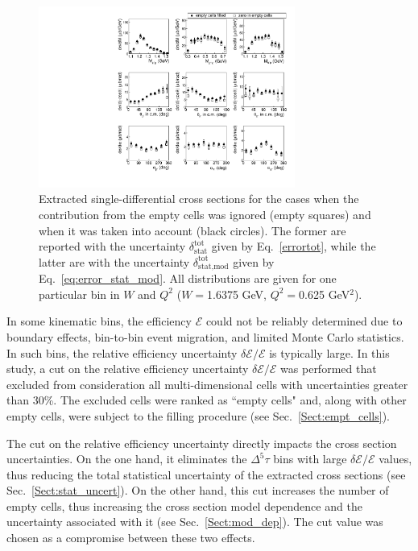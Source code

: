 \documentclass[prc,twocolumn,superscriptaddress,showpacs,amssymb,amsmath,amsfonts,aps,nofootinbib]{revtex4-1}
\begin{document}
\begin{figure}[htp]
\begin{center}
\includegraphics[width=0.75\textwidth]{pictures/corrections/cr_sec_all_top_new2.pdf}
\caption{\small Extracted single-differential cross sections for the cases when the contribution from the empty cells was ignored (empty squares) and when it was taken into account (black circles). The former are reported with the uncertainty $\delta_{\text{stat}}^{\text{tot}}$ given by Eq.\!~\eqref{errortot}, while the latter are with the uncertainty $\delta_{\text{stat,mod}}^{\text{tot}}$ given by Eq.\!~\eqref{eq:error_stat_mod}. All distributions are given for one particular bin in $W$ and $Q^2$ ($W = $1.6375 GeV, $Q^2 = $0.625 GeV$^2$).} \label{fig:empt_corr}
\end{center}
\end{figure}


In some kinematic bins, the efficiency $\mathcal{E}$ could not be reliably determined due to boundary effects, bin-to-bin event migration, and limited Monte Carlo statistics. In such bins, the relative efficiency uncertainty $\delta \mathcal{E}/\mathcal{E}$ is typically large. In this study, a cut on the relative efficiency uncertainty $\delta \mathcal{E}/\mathcal{E}$ was performed that excluded from consideration all multi-dimensional cells with uncertainties greater than 30\%. The excluded cells were ranked as ``empty cells" and, along with other empty cells, were subject to the filling procedure (see Sec.\!~\ref{Sect:empt_cells}).


The cut on the relative efficiency uncertainty directly impacts the cross section uncertainties. On the one hand, it eliminates the $\Delta^{5} \tau$ bins with large $\delta \mathcal{E}/\mathcal{E}$ values, thus reducing the total statistical uncertainty of the extracted cross sections (see Sec.\!~\ref{Sect:stat_uncert}). On the other hand, this cut increases the number of empty cells, thus increasing the cross section model dependence and the uncertainty associated with it (see Sec.\!~\ref{Sect:mod_dep}). The cut value was chosen as a compromise between these two effects. 
\end{document}
